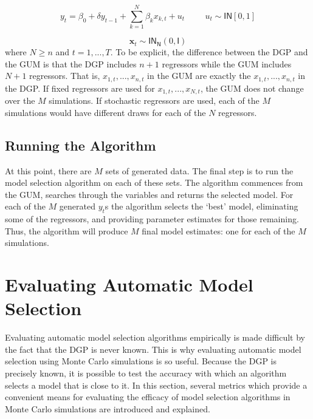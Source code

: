 $$y_{t}=\beta_{0} + \delta y_{t-1}+\sum_{k=1}^{N}\beta_{k}x_{k,t} + u_{t}  \hspace{1cm}  u_{t} \sim \mathsf{IN}[0, 1]$$

$$\mathbf{x}_{t} \sim \mathsf{IN_{N}}(0, \mathsf{I}) $$
where $N \geq n $ and $ t = 1,...,T$. To be explicit, the difference between the DGP and the GUM is that the DGP includes $n+1$ regressors while the GUM includes $N+1$ regressors. That is, $x_{1,t},...,x_{n,t}$ in the GUM are exactly the $x_{1,t},...,x_{n,t}$ in the DGP. If fixed regressors are used for $x_{1,t},...,x_{N,t}$, the GUM does not change over the $M$ simulations. If stochastic regressors are used, each of the $M$ simulations would have different draws for each of the $N$ regressors. 


 
 \subsection{Running the Algorithm}
At this point, there are $M$ sets of generated data. The final step is to run the model selection algorithm on each of these sets. The algorithm commences from the GUM, searches through the variables and returns the selected model. For each of the $M$ generated ${y_{t}}$s the algorithm selects the `best' model, eliminating some of the regressors, and providing parameter estimates for those remaining. Thus, the algorithm will produce $M$ final model estimates: one for each of the $M$ simulations. 






\section{Evaluating Automatic Model Selection}


Evaluating automatic model selection algorithms empirically is made difficult by the fact that the DGP is never known. This is why evaluating automatic model selection using Monte Carlo simulations is so useful. Because the DGP is precisely known, it is possible to test the accuracy with which an algorithm selects a model that is close to it. In this section, several metrics which provide a convenient means for evaluating the efficacy of model selection algorithms in Monte Carlo simulations are introduced and explained.    

